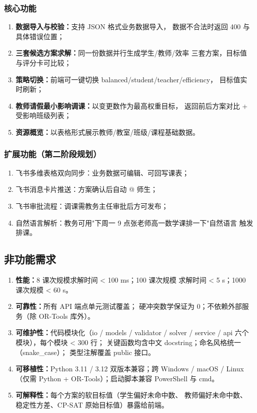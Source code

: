 \subsubsection{核心功能}

\begin{enumerate}[leftmargin=2em,itemsep=0.2em]
\item \textbf{数据导入与校验：}支持 JSON 格式业务数据导入，
数据不合法时返回 400 与具体错误位置；
\item \textbf{三套候选方案求解：}同一份数据并行生成学生/教师/效率
三套方案，目标值与评分卡可比较；
\item \textbf{策略切换：}前端可一键切换 balanced/student/teacher/efficiency，
目标值实时刷新；
\item \textbf{教师请假最小影响调课：}以变更数作为最高权重目标，
返回前后方案对比 + 受影响班级列表；
\item \textbf{资源概览：}以表格形式展示教师/教室/班级/课程基础数据。
\end{enumerate}

\subsubsection{扩展功能（第二阶段规划）}

\begin{enumerate}[leftmargin=2em,itemsep=0.2em]
\item 飞书多维表格双向同步：业务数据可编辑、可回写课表；
\item 飞书消息卡片推送：方案确认后自动 @ 师生；
\item 飞书审批流程：调课需教务主任审批后方可发布；
\item 自然语言解析：教务可用"下周一 9 点张老师高一数学课排一下"自然语言
触发排课。
\end{enumerate}

\subsection{非功能需求}

\begin{enumerate}[leftmargin=2em,itemsep=0.2em]
\item \textbf{性能：}8 课次规模求解时间 < 100 ms；100 课次规模
求解时间 < 5 s；1000 课次规模 < 60 s。
\item \textbf{可靠性：}所有 API 端点单元测试覆盖；
硬冲突数学保证为 0；不依赖外部服务（除 OR-Tools 库外）。
\item \textbf{可维护性：}代码模块化（io / models / validator / solver /
service / api 六个模块），每个模块 < 300 行；
关键函数均含中文 docstring；命名风格统一（snake\_case）；
类型注解覆盖 public 接口。
\item \textbf{可移植性：}Python 3.11 / 3.12 双版本兼容；跨 Windows / macOS / Linux
（仅需 Python + OR-Tools）；启动脚本兼容 PowerShell 与 cmd。
\item \textbf{可解释性：}每个方案的软目标值（学生偏好未命中数、
教师偏好未命中数、稳定性方差、CP-SAT 原始目标值）暴露给前端。
\end{enumerate}

